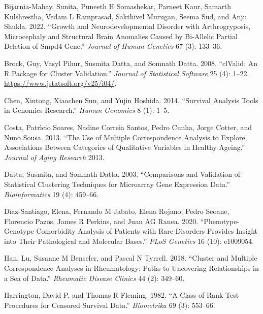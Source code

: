 \documentclass[
  letterpaper,
  DIV=11,
  numbers=noendperiod]{scrartcl}
\newlength{\cslhangindent}
\newlength{\cslentryspacingunit} %
\newenvironment{CSLReferences}[2] %
 {%
  \setlength{\parindent}{0pt}
  \ifodd #1
  \let\oldpar\par
  \def\par{\hangindent=\cslhangindent\oldpar}
  \fi
  \setlength{\parskip}{#2\cslentryspacingunit}
 }%
 {}
\begin{document}
\hypertarget{refs}{}
\begin{CSLReferences}{1}{0}
\leavevmode{}%
Bijarnia-Mahay, Sunita, Puneeth H Somashekar, Parneet Kaur, Samarth
Kulshrestha, Vedam L Ramprasad, Sakthivel Murugan, Seema Sud, and Anju
Shukla. 2022. {``Growth and Neurodevelopmental Disorder with
Arthrogryposis, Microcephaly and Structural Brain Anomalies Caused by
Bi-Allelic Partial Deletion of Smpd4 Gene.''} \emph{Journal of Human
Genetics} 67 (3): 133--36.

\leavevmode{}%
Brock, Guy, Vasyl Pihur, Susmita Datta, and Somnath Datta. 2008.
{``{clValid}: An {R} Package for Cluster Validation.''} \emph{Journal of
Statistical Software} 25 (4): 1--22.
\url{https://www.jstatsoft.org/v25/i04/}.

\leavevmode{}%
Chen, Xintong, Xiaochen Sun, and Yujin Hoshida. 2014. {``Survival
Analysis Tools in Genomics Research.''} \emph{Human Genomics} 8 (1):
1--5.

\leavevmode{}%
Costa, Patrı́cio Soares, Nadine Correia Santos, Pedro Cunha, Jorge
Cotter, and Nuno Sousa. 2013. {``The Use of Multiple Correspondence
Analysis to Explore Associations Between Categories of Qualitative
Variables in Healthy Ageing.''} \emph{Journal of Aging Research} 2013.

\leavevmode{}%
Datta, Susmita, and Somnath Datta. 2003. {``Comparisons and Validation
of Statistical Clustering Techniques for Microarray Gene Expression
Data.''} \emph{Bioinformatics} 19 (4): 459--66.

\leavevmode{}%
Dı́az-Santiago, Elena, Fernando M Jabato, Elena Rojano, Pedro Seoane,
Florencio Pazos, James R Perkins, and Juan AG Ranea. 2020.
{``Phenotype-Genotype Comorbidity Analysis of Patients with Rare
Disorders Provides Insight into Their Pathological and Molecular
Bases.''} \emph{PLoS Genetics} 16 (10): e1009054.

\leavevmode{}%
Han, Lu, Susanne M Benseler, and Pascal N Tyrrell. 2018. {``Cluster and
Multiple Correspondence Analyses in Rheumatology: Paths to Uncovering
Relationships in a Sea of Data.''} \emph{Rheumatic Disease Clinics} 44
(2): 349--60.

\leavevmode{}%
Harrington, David P, and Thomas R Fleming. 1982. {``A Class of Rank Test
Procedures for Censored Survival Data.''} \emph{Biometrika} 69 (3):
553--66.


\end{CSLReferences}
\end{document}
